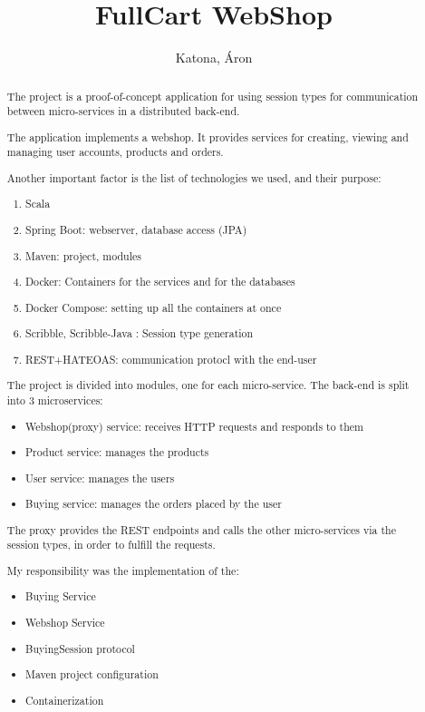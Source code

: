 \documentclass{article}
\title{FullCart WebShop}
\author{Katona, Áron}
\date{\parbox{\linewidth}{\centering%
  Team\endgraf\medskip
  Fodor, Zsófia \hspace*{3cm} Katona, Áron\endgraf\bigskip
  \today\endgraf
  }}
\begin{document}
\maketitle

\newpage
{}

\begin{abstract}

The project is a proof-of-concept application for using session types for communication between micro-services in a distributed back-end. 

The application implements a webshop. It provides services for creating, viewing and managing user accounts, products and orders.

Another important factor is the list of technologies we used, and their purpose:

\begin{enumerate}
    \item Scala
    \item Spring Boot: webserver, database access (JPA)
    \item Maven: project, modules
    \item Docker: Containers for the services and for the databases
    \item Docker Compose: setting up all the containers at once
    \item Scribble, Scribble-Java \cite{HY2016}: Session type generation
    \item REST+HATEOAS: communication protocl with the end-user
\end{enumerate}

The project is divided into modules, one for each micro-service. The back-end is split into 3 microservices:

\begin{itemize}
    \item Webshop(proxy) service: receives HTTP requests and responds to them
    \item Product service: manages the products
    \item User service: manages the users
    \item Buying service: manages the orders placed by the user
\end{itemize}

The proxy provides the REST endpoints and calls the other micro-services via the session types, in order to fulfill the requests.


My responsibility was the implementation of the:

\begin{itemize}
    \item Buying Service
    \item Webshop Service
    \item BuyingSession protocol
    \item Maven project configuration
    \item Containerization
\end{itemize}

\end{abstract}
\end{document}
